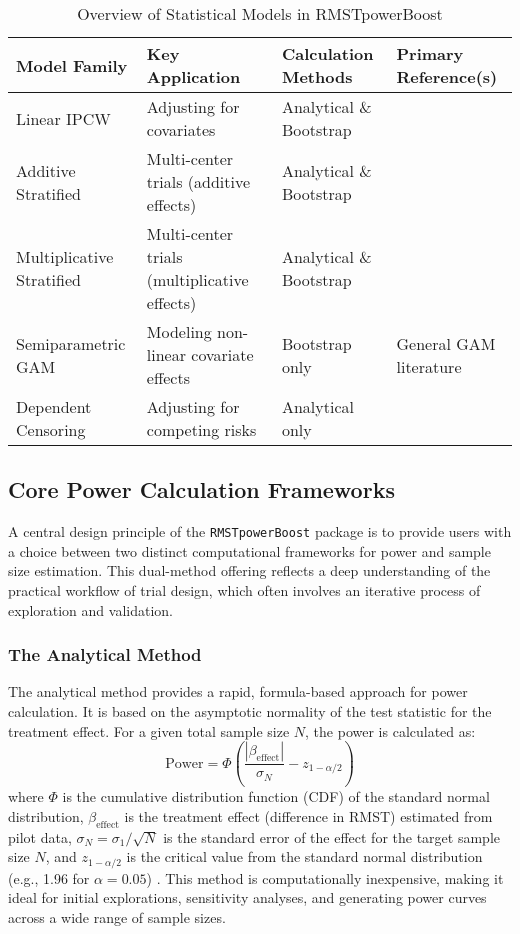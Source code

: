 \documentclass[article]{jss}
\begin{document}
\begin{table}[h!]
\centering
\caption{Overview of Statistical Models in RMSTpowerBoost}
\label{tab:model_overview}
\begin{tabular}{@{}llll@{}}
\toprule
\textbf{Model Family} & \textbf{Key Application} & \textbf{Calculation Methods} & \textbf{Primary Reference(s)} \\ \midrule
Linear IPCW & Adjusting for covariates & Analytical \& Bootstrap & \citet{tian2014} \\
Additive Stratified & Multi-center trials (additive effects) & Analytical \& Bootstrap & \citet{zhang2024} \\
Multiplicative Stratified & Multi-center trials (multiplicative effects) & Analytical \& Bootstrap & \citet{wang2019} \\
Semiparametric GAM & Modeling non-linear covariate effects & Bootstrap only & General GAM literature \\
Dependent Censoring & Adjusting for competing risks & Analytical only & \citet{wang2018} \\ \bottomrule
\end{tabular}
\end{table}

\subsection{Core Power Calculation Frameworks}
A central design principle of the \texttt{RMSTpowerBoost} package is to provide users with a choice between two distinct computational frameworks for power and sample size estimation. This dual-method offering reflects a deep understanding of the practical workflow of trial design, which often involves an iterative process of exploration and validation.

\subsubsection{The Analytical Method}
The analytical method provides a rapid, formula-based approach for power calculation. It is based on the asymptotic normality of the test statistic for the treatment effect. For a given total sample size $N$, the power is calculated as:
\begin{equation}
\text{Power} = \Phi\left( \frac{|\beta_{\text{effect}}|}{\sigma_N} - z_{1-\alpha/2} \right)
\end{equation}
where $\Phi$ is the cumulative distribution function (CDF) of the standard normal distribution, $\beta_{\text{effect}}$ is the treatment effect (difference in RMST) estimated from pilot data, $\sigma_N = \sigma_1 / \sqrt{N}$ is the standard error of the effect for the target sample size $N$, and $z_{1-\alpha/2}$ is the critical value from the standard normal distribution (e.g., 1.96 for $\alpha=0.05$) \cite{[1]}. This method is computationally inexpensive, making it ideal for initial explorations, sensitivity analyses, and generating power curves across a wide range of sample sizes.
\end{document}
